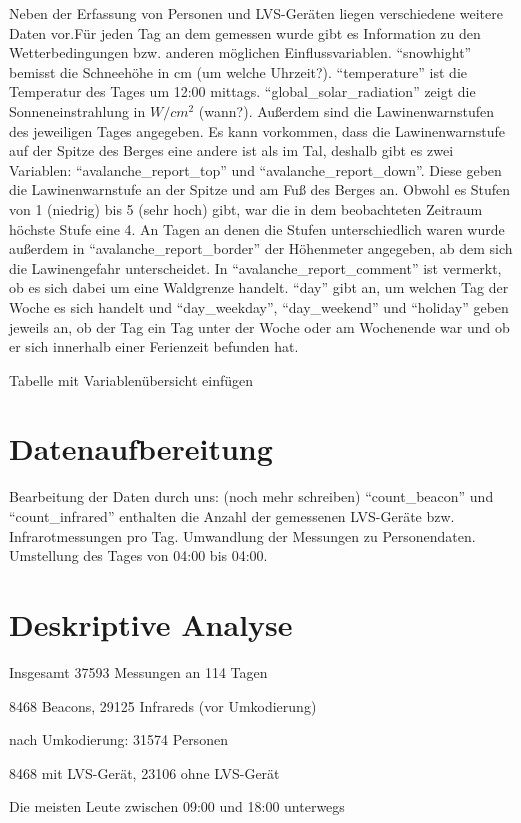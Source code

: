 \documentclass[11pt,a4paper]{report}
\begin{document}
Neben der Erfassung von Personen und LVS-Geräten liegen verschiedene weitere Daten vor.Für jeden Tag an dem gemessen wurde gibt es Information zu den Wetterbedingungen bzw. anderen möglichen Einflussvariablen. "`snowhight"' bemisst die Schneehöhe in cm (um welche Uhrzeit?). "`temperature"' ist die Temperatur des Tages um 12:00 mittags. "`global\_solar\_radiation"' zeigt die Sonneneinstrahlung in $W/cm^2$ (wann?). Außerdem sind die Lawinenwarnstufen des jeweiligen Tages angegeben. Es kann vorkommen, dass die Lawinenwarnstufe auf der Spitze des Berges eine andere ist als im Tal, deshalb gibt es zwei Variablen: "`avalanche\_report\_top"' und "`avalanche\_report\_down"'. Diese geben die Lawinenwarnstufe an der Spitze und am Fuß des Berges an. Obwohl es Stufen von 1 (niedrig) bis 5 (sehr hoch) gibt, war die in dem beobachteten Zeitraum höchste Stufe eine 4. An Tagen an denen die Stufen unterschiedlich waren wurde außerdem in "`avalanche\_report\_border"' der Höhenmeter angegeben, ab dem sich die Lawinengefahr unterscheidet. In "`avalanche\_report\_comment"' ist vermerkt, ob es sich dabei um eine Waldgrenze handelt. "`day"' gibt an, um welchen Tag der Woche es sich handelt und "`day\_weekday"', "`day\_weekend"' und "`holiday"' geben jeweils an, ob der Tag ein Tag unter der Woche oder am Wochenende war und ob er sich innerhalb einer Ferienzeit befunden hat.

Tabelle mit Variablenübersicht einfügen

\section{Datenaufbereitung}

Bearbeitung der Daten durch uns:
(noch mehr schreiben)
"`count\_beacon"' und "`count\_infrared"' enthalten die Anzahl der gemessenen LVS-Geräte bzw. Infrarotmessungen pro Tag.
Umwandlung der Messungen zu Personendaten. Umstellung des Tages von 04:00 bis 04:00.

\section{Deskriptive Analyse}

Insgesamt 37593 Messungen an 114 Tagen

8468 Beacons, 29125 Infrareds (vor Umkodierung)

nach Umkodierung: 31574 Personen

8468 mit LVS-Gerät, 23106 ohne LVS-Gerät

Die meisten Leute zwischen 09:00 und 18:00 unterwegs
\end{document}
